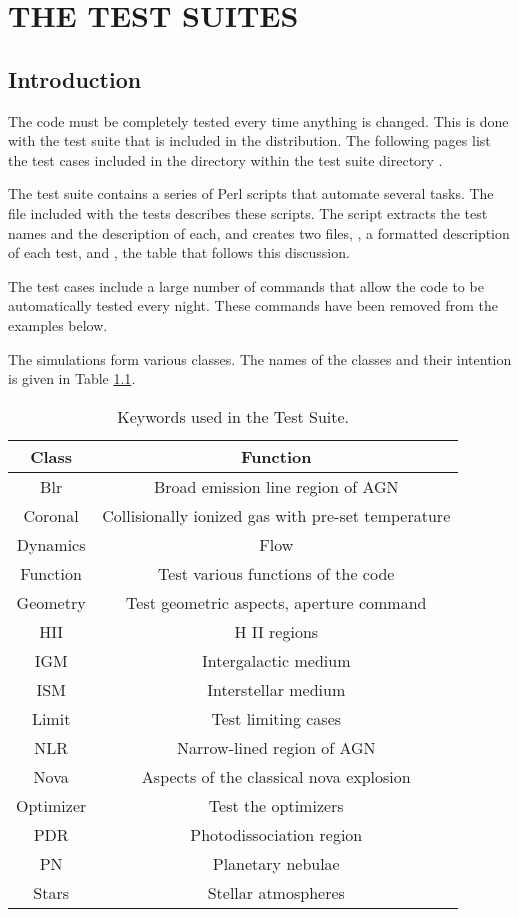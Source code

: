 \chapter{THE TEST SUITES}

\section{Introduction}

The code must be completely tested every time anything is changed.
This is done with the test suite that is included in the distribution.
The following pages list the test cases included in the  directory
within the test suite directory .

The test suite contains a series of Perl scripts that automate several tasks.
The  file included with the tests
describes these scripts.
The script  extracts the test names
and the description of each, and creates two files,
, a formatted description of each test,
and , the table that
follows this discussion.

The test cases include a large number of  commands that allow the code to be
automatically tested every night.
These  commands have been removed from the examples below.

The simulations form various classes. The names of the classes and their intention
is given in Table \ref{tab:ClassesOfSimulations}.

\begin{table}
\centering
\caption{\label{tab:ClassesOfSimulations}
Keywords used in the Test Suite.}
\begin{tabular}{ c c  }
\hline
Class & Function \\
\hline
Blr & Broad emission line region of AGN \\
Coronal & Collisionally ionized gas with pre-set temperature \\
Dynamics & Flow \\
Function & Test various functions of the code \\
Geometry & Test geometric aspects, aperture command \\
HII & H II regions \\
IGM & Intergalactic medium \\
ISM & Interstellar medium \\
Limit & Test limiting cases \\
NLR & Narrow-lined region of AGN \\
Nova & Aspects of the classical nova explosion \\
Optimizer & Test the optimizers \\
PDR & Photodissociation region \\
PN & Planetary nebulae \\
Stars & Stellar atmospheres \\
\hline
\end{tabular}
\end{table}


